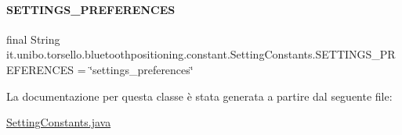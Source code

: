 \paragraph{\texorpdfstring{S\+E\+T\+T\+I\+N\+G\+S\+\_\+\+P\+R\+E\+F\+E\+R\+E\+N\+C\+ES}{SETTINGS\_PREFERENCES}}
{\footnotesize\ttfamily final String it.\+unibo.\+torsello.\+bluetoothpositioning.\+constant.\+Setting\+Constants.\+S\+E\+T\+T\+I\+N\+G\+S\+\_\+\+P\+R\+E\+F\+E\+R\+E\+N\+C\+ES = \char`\"{}settings\+\_\+preferences\char`\"{}\hspace{0.3cm}{\ttfamily [static]}}



La documentazione per questa classe è stata generata a partire dal seguente file\+:\begin{DoxyCompactItemize}
\item 
\hyperlink{SettingConstants_8java}{Setting\+Constants.\+java}\end{DoxyCompactItemize}
